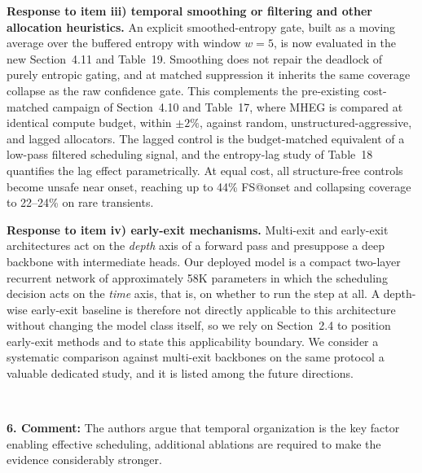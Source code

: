 \documentclass[1p,12pt,authoryear]{elsarticle}
\begin{document}
\vspace{2mm}
\noindent \textbf{Response to item iii) temporal smoothing or filtering and other allocation heuristics.} An explicit smoothed-entropy gate, built as a moving average over the buffered entropy with window $w{=}5$, is now evaluated in the new Section~4.11 and Table~19. Smoothing does not repair the deadlock of purely entropic gating, and at matched suppression it inherits the same coverage collapse as the raw confidence gate. This complements the pre-existing cost-matched campaign of Section~4.10 and Table~17, where MHEG is compared at identical compute budget, within $\pm 2\%$, against random, unstructured-aggressive, and lagged allocators. The lagged control is the budget-matched equivalent of a low-pass filtered scheduling signal, and the entropy-lag study of Table~18 quantifies the lag effect parametrically. At equal cost, all structure-free controls become unsafe near onset, reaching up to 44\% FS@onset and collapsing coverage to 22--24\% on rare transients.

\vspace{2mm}
\noindent \textbf{Response to item iv) early-exit mechanisms.} Multi-exit and early-exit architectures act on the \emph{depth} axis of a forward pass and presuppose a deep backbone with intermediate heads. Our deployed model is a compact two-layer recurrent network of approximately 58K parameters in which the scheduling decision acts on the \emph{time} axis, that is, on whether to run the step at all. A depth-wise early-exit baseline is therefore not directly applicable to this architecture without changing the model class itself, so we rely on Section~2.4 to position early-exit methods and to state this applicability boundary. We consider a systematic comparison against multi-exit backbones on the same protocol a valuable dedicated study, and it is listed among the future directions.

~

\noindent \textbf{6. Comment:} The authors argue that temporal organization is the key factor enabling effective scheduling, additional ablations are required to make the evidence considerably stronger.
\end{document}
